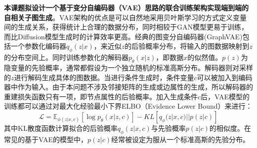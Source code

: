\documentclass[12pt,UTF8,AutoFakeBold=2,a4paper]{ctexart} %
\begin{document}


\textbf{本课题拟设计一个基于变分自编码器（VAE）思路的联合训练架构实现端到端的自相关子图生成}。VAE架构的优点是可以自然地采用贝叶斯学习的方式定义变量间的生成关系，获得统计上合理的数据分布，同时相较于GAN模型更易于训练，而比Diffusion模型生成时的计算效率更高。经典的图变分自编码器(GraphVAE)包括一个参数化编码器$q_\phi(z|x)$，来近似$z$的后验概率分布，将输入的图数据映射到$z$的分布空间上。同时训练参数化的解码器$p_\theta(x|z)$，即数据$x$的似然值。$p(z)$为隐变量的先验概率，通常都假设为一个独立随机的标准高斯分布。解码器则对采样的$z$进行解码生成具体的图数据。当进行条件生成时，条件变量$c$可以被加入到编码器中作为输入。由于本问题不涉及邻接矩阵的生成或边属性的生成，所以解码器的重建损失函数只有一项，即节点属性的后验概率。加入生成条件$c$后，VAE模型的训练都可以通过对最大化经验最小下界ELBO（Evidence Lower Bound）来进行：
\begin{equation}
    \mathcal{L} = \mathbb{E}_{\phi(z|x,c)}[\log p_\theta(x|z,c)]-KL[q_\phi(z|x,c)||p(z|c)]
\end{equation}
其中KL散度函数计算拟合的后验概率$q_\phi(z|x,c)$与先验概率$p(z|c)$的相似度。在常见的基于VAE的模型中，$p(z|c)$经常被设定为服从一个标准高斯的先验分布。
\end{document}
